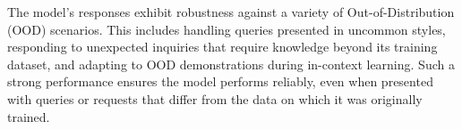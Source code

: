 The model's responses exhibit robustness against a variety of Out-of-Distribution (OOD) scenarios. This includes handling queries presented in uncommon styles, responding to unexpected inquiries that require knowledge beyond its training dataset, and adapting to OOD demonstrations during in-context learning. Such a strong performance ensures the model performs reliably, even when presented with queries or requests that differ from the data on which it was originally trained.
